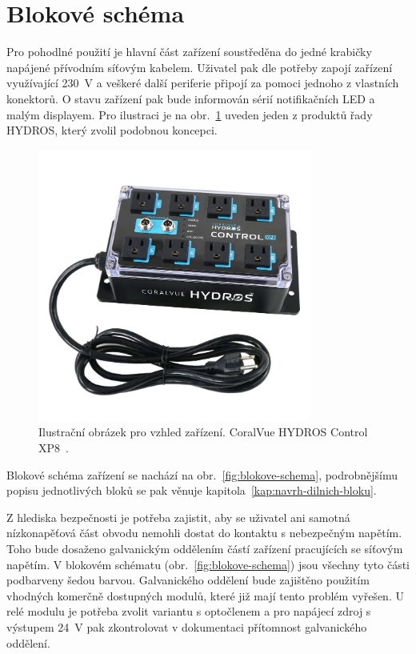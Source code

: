 \section{Blokové schéma}
    Pro pohodlné použití je hlavní část zařízení soustředěna do jedné krabičky napájené přívodním síťovým kabelem. Uživatel pak dle potřeby zapojí zařízení využívající \qty{230}{V} a veškeré další periferie připojí za pomoci jednoho z vlastních konektorů. O stavu zařízení pak bude informován sérií notifikačních LED a malým displayem. Pro ilustraci je na obr.~\ref{fig:obrazky-hydros-control} uveden jeden z produktů řady HYDROS, který zvolil podobnou koncepci.


    \begin{figure}[h!]
        \centering
        \includegraphics[width=0.8\textwidth]{obrazky/hydros.jpg}
        \caption{Ilustrační obrázek pro vzhled zařízení. CoralVue HYDROS Control XP8~\cite{coralvuehydros}. }
        \label{fig:obrazky-hydros-control}
    \end{figure}

    Blokové schéma zařízení se nachází na obr.~\ref{fig:blokove-schema}, podrobnějšímu popisu jednotlivých bloků se pak věnuje kapitola~\ref{kap:navrh-dilnich-bloku}. 
    
    Z hlediska bezpečnosti je potřeba zajistit, aby se uživatel ani samotná nízkonapěťová část obvodu nemohli dostat do kontaktu s nebezpečným napětím. Toho bude dosaženo galvanickým oddělením částí zařízení pracujících se síťovým napětím. V blokovém schématu (obr.~\ref{fig:blokove-schema}) jsou všechny tyto části podbarveny šedou barvou. Galvanického oddělení bude zajištěno použitím vhodných komerčně dostupných modulů, které již mají tento problém vyřešen. U relé modulu je potřeba zvolit variantu s optočlenem a pro napájecí zdroj s výstupem \qty{24}{V} pak zkontrolovat v dokumentaci přítomnost galvanického oddělení. 
    
